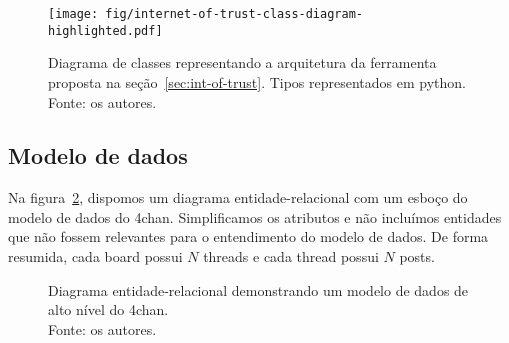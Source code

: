 \begin{figure}[htb]
    \centering
    \texttt{[image: fig/internet-of-trust-class-diagram-highlighted.pdf]}
    \caption[Ferramenta 3: internet of trust - diagrama de classes]{
        Diagrama de classes representando a arquitetura da ferramenta proposta na seção~\ref{sec:int-of-trust}. Tipos representados em python.\\
        Fonte: os autores.
    }
    \label{fig:internet-of-trust-class-diagram}
\end{figure}


\subsection{Modelo de dados}

Na figura~\ref{fig:er-4chan}, dispomos um diagrama entidade-relacional com um esboço do modelo de dados do 4chan.
Simplificamos os atributos e não incluímos entidades que não fossem relevantes para o entendimento do modelo de dados.
De forma resumida, cada board possui $N$ threads e cada thread possui $N$ posts.

\begin{figure}[H]
    \centering
    \caption[Diagrama ER do modelo de dados do 4chan]{
        Diagrama entidade-relacional demonstrando um modelo de dados de alto nível do 4chan.\\
        Fonte: os autores.
    }
    \label{fig:er-4chan}
\end{figure}

